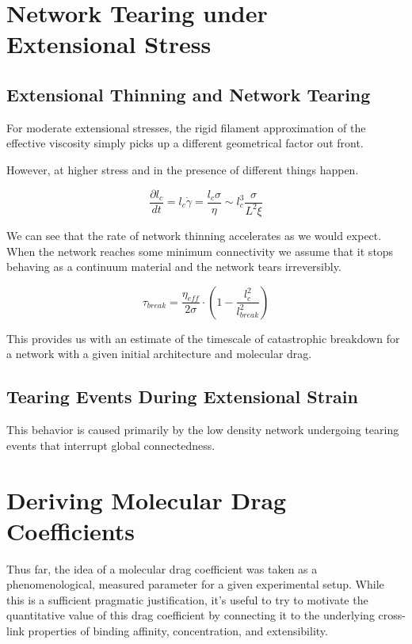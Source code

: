 \section{Network Tearing under Extensional Stress}


\subsection{Extensional Thinning and Network Tearing}

For moderate extensional stresses, the rigid filament approximation of the effective viscosity simply picks up a different geometrical factor out front.  

However, at higher stress and in the presence of different things happen.

\begin{equation}
\frac{\partial l_c}{dt}=l_c\dot \gamma =\frac{l_c \sigma}{\eta}\sim l_c^3\frac{ \sigma}{L^2 \xi}
\end{equation}

We can see that the rate of network thinning accelerates as we would expect.  When the network reaches some minimum connectivity we assume that it stops behaving as a continuum material and the network tears irreversibly.  

\begin{equation}
\tau_{break} = \frac{\eta_{eff}}{2\sigma}\cdot\left ( 1 -\frac{l_c^2}{l_{break}^2} \right )
\end{equation}

This provides us with an estimate of the timescale of catastrophic breakdown for a network with a given initial architecture and molecular drag.


\subsection{Tearing Events During Extensional Strain}

This behavior is caused primarily by the low density network undergoing tearing events that interrupt global connectedness.  




\section{Deriving Molecular Drag Coefficients}
\label{app:drag}
Thus far, the idea of a molecular drag coefficient was taken as a phenomenological, measured parameter for a given experimental setup.  While this is a sufficient pragmatic justification, it's useful to try to motivate the quantitative value of this drag coefficient by connecting it to the underlying cross-link properties of binding affinity, concentration, and extensibility.

